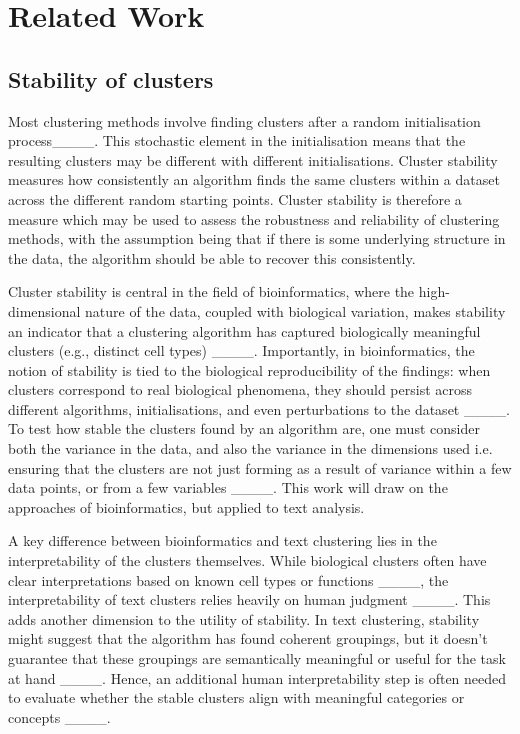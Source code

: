 \section{Related Work}
\subsection*{Stability of clusters}
Most clustering methods involve finding clusters after a random initialisation process____.  
This stochastic element in the initialisation means that the resulting clusters may be different with different initialisations. Cluster stability measures how consistently an algorithm finds the same clusters within a dataset across the different random starting points.  Cluster stability is therefore a measure which may be used to assess the robustness and reliability of clustering methods, with the assumption being that if there is some underlying structure in the data, the algorithm should be able to recover this consistently.  




Cluster stability is central in the field of bioinformatics, where the high-dimensional nature of the data, coupled with biological variation, makes stability an indicator that a clustering algorithm has captured biologically meaningful clusters (e.g., distinct cell types) ____. 
Importantly, in bioinformatics, the notion of stability is tied to the biological reproducibility of the findings: when clusters correspond to real biological phenomena, they should persist across different algorithms, initialisations, and even perturbations to the dataset ____. To test how stable the clusters found by an algorithm are, one must consider both the variance in the data, and also the variance in the dimensions used i.e. ensuring that the clusters are not just forming as a result of variance within a few data points, or from a few variables ____.  This work will draw on the approaches of bioinformatics, but applied to text analysis.


A key difference between bioinformatics and text clustering lies in the interpretability of the clusters themselves. While biological clusters often have clear interpretations based on known cell types or functions ____, the interpretability of text clusters relies heavily on human judgment ____. 
This adds another dimension to the utility of stability. In text clustering, stability might suggest that the algorithm has found coherent groupings, but it doesn’t guarantee that these groupings are semantically meaningful or useful for the task at hand ____. Hence, an additional human interpretability step is often needed to evaluate whether the stable clusters align with meaningful categories or concepts ____.




